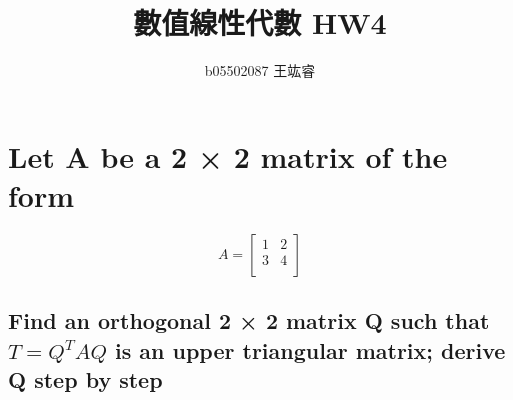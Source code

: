 \documentclass[12pt]{article}
\author{b05502087 王竑睿}
\date{}
\title{數值線性代數 HW4}
\begin{document}
\maketitle
\section{Let A be a 2 × 2 matrix of the form}
    \[
    A=
    \left[ 
        \begin{array}{cc}
        1 & 2\\
        3 & 4\\
        \end{array} 
    \right]
    \]
    \subsection*{Find an orthogonal 2 × 2 matrix Q such that $T = Q^TAQ$ is an upper triangular
    matrix; derive Q step by step}
\end{document}
